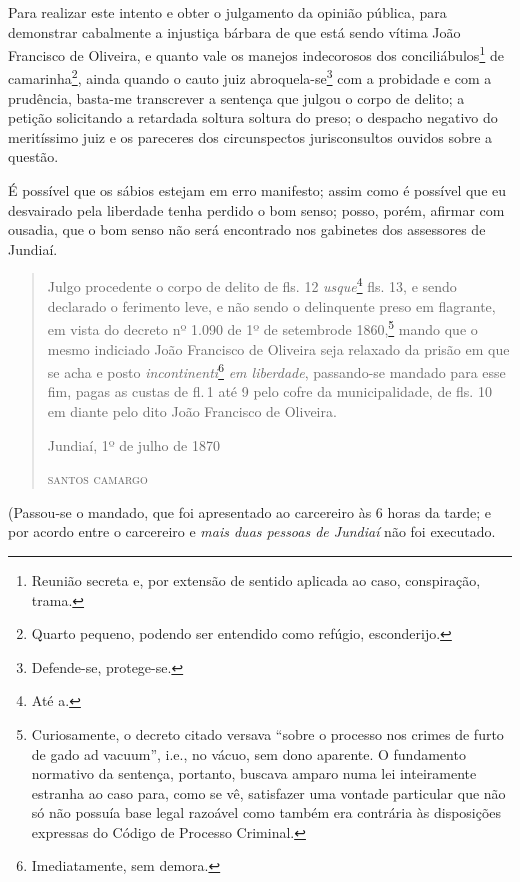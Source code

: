Para realizar este intento e obter o julgamento da opinião pública, para
demonstrar cabalmente a injustiça bárbara de que está sendo vítima João
Francisco de Oliveira, e quanto vale os manejos indecorosos dos
conciliábulos\footnote{ Reunião secreta e, por extensão de sentido
  aplicada ao caso, conspiração, trama.} de camarinha\footnote{ Quarto
  pequeno, podendo ser entendido como refúgio, esconderijo.}, ainda
quando o cauto juiz abroquela-se\footnote{ Defende-se, protege-se.} com
a probidade e com a prudência, basta-me transcrever a sentença que
julgou o corpo de delito; a petição solicitando a retardada soltura
soltura do preso; o despacho negativo do meritíssimo juiz e os pareceres
dos circunspectos jurisconsultos ouvidos sobre a questão.

É possível que os sábios estejam em erro manifesto; assim como é
possível que eu desvairado pela liberdade tenha perdido o bom senso;
posso, porém, afirmar com ousadia, que o bom senso não será encontrado
nos gabinetes dos assessores de Jundiaí.

\asterisc{}

\begin{quote}
Julgo procedente o corpo de delito de fls. 12 \emph{usque}\footnote{
  Até a.} fls. 13, e sendo declarado o ferimento leve, e não sendo o
delinquente preso em flagrante, em vista do decreto nº 1.090 de 1º de
setembrode 1860,\footnote{ Curiosamente, o decreto citado versava
  ``sobre o processo nos crimes de furto de gado ad vacuum'', i.e., no
  vácuo, sem dono aparente. O fundamento normativo da sentença,
  portanto, buscava amparo numa lei inteiramente estranha ao caso para,
  como se vê, satisfazer uma vontade particular que não só não possuía
  base legal razoável como também era contrária às disposições expressas
  do Código de Processo Criminal.} mando que o mesmo indiciado João
Francisco de Oliveira seja relaxado da prisão em que se acha e posto
\emph{incontinenti}\footnote{ Imediatamente, sem demora.} \emph{em
liberdade}, passando-se mandado para esse fim, pagas as custas de fl.\,1
até 9 pelo cofre da municipalidade, de fls. 10 em diante pelo dito João
Francisco de Oliveira.

\begin{flushright}
Jundiaí, 1º de julho de 1870

\textsc{santos camargo}
\end{flushright}
\end{quote}

(Passou-se o mandado, que foi apresentado ao carcereiro às 6 horas da
tarde; e por acordo entre o carcereiro e \emph{mais duas pessoas de
Jundiaí} não foi executado.

